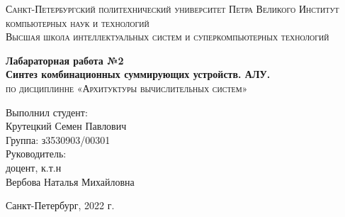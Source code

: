 \begin{titlepage}
    \begin{center}
        \textsc{
            Санкт-Петербургский политехнический университет Петра Великого Институт компьютерных наук и технологий \\[5mm]
            Высшая школа интеллектуальных систем и суперкомпьютерных технологий    
        }

        \vfill

        \textbf{
            Лабараторная работа №2 \\[2mm]
            Синтез комбинационных суммирующих устройств. АЛУ. \\
        }
        \textsc{
            по дисциплинне «Архитуктуры вычислительных систем»
        }
    \end{center}

    \hfill

    \begin{flushright}
        \begin{minipage}{0.35\textwidth}
            Выполнил студент: \\[2mm]
            Крутецкий Семен Павлович \\
            Группа: з3530903/00301 \\[15mm]
            Руководитель:\\[2mm] 
            доцент, к.т.н \\
            Вербова Наталья Михайловна
        \end{minipage}
    \end{flushright}
    
    \vfill

    \begin{center}
        Санкт-Петербург, 2022 г.
    \end{center}
\end{titlepage}

\newpage

\tableofcontents
\newpage